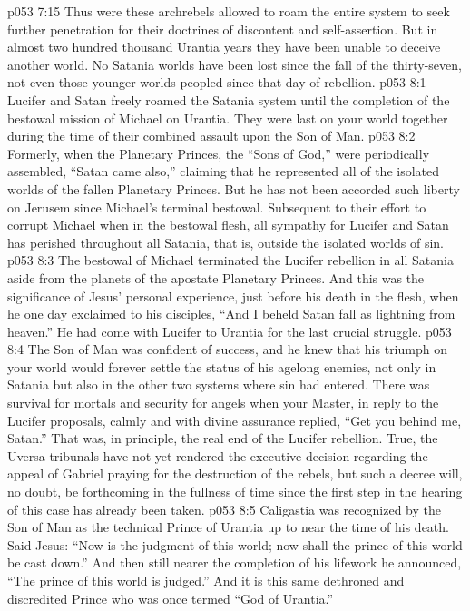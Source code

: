 \vs p053 7:15 Thus were these archrebels allowed to roam the entire system to seek further penetration for their doctrines of discontent and self\hyp{}assertion. But in almost two hundred thousand Urantia years they have been unable to deceive another world. No Satania worlds have been lost since the fall of the thirty\hyp{}seven, not even those younger worlds peopled since that day of rebellion.
\vs p053 8:1 Lucifer and Satan freely roamed the Satania system until the completion of the bestowal mission of Michael on Urantia. They were last on your world together during the time of their combined assault upon the Son of Man.
\vs p053 8:2 Formerly, when the Planetary Princes, the “Sons of God,” were periodically assembled, “Satan came also,” claiming that he represented all of the isolated worlds of the fallen Planetary Princes. But he has not been accorded such liberty on Jerusem since Michael’s terminal bestowal. Subsequent to their effort to corrupt Michael when in the bestowal flesh, all sympathy for Lucifer and Satan has perished throughout all Satania, that is, outside the isolated worlds of sin.
\pc \vs p053 8:3 The bestowal of Michael terminated the Lucifer rebellion in all Satania aside from the planets of the apostate Planetary Princes. And this was the significance of Jesus’ personal experience, just before his death in the flesh, when he one day exclaimed to his disciples, \textcolor{ubdarkred}{“And I beheld Satan fall as lightning from heaven.”} He had come with Lucifer to Urantia for the last crucial struggle.
\vs p053 8:4 The Son of Man was confident of success, and he knew that his triumph on your world would forever settle the status of his agelong enemies, not only in Satania but also in the other two systems where sin had entered. There was survival for mortals and security for angels when your Master, in reply to the Lucifer proposals, calmly and with divine assurance replied, \textcolor{ubdarkred}{“Get you behind me, Satan.”} That was, in principle, the real end of the Lucifer rebellion. True, the Uversa tribunals have not yet rendered the executive decision regarding the appeal of Gabriel praying for the destruction of the rebels, but such a decree will, no doubt, be forthcoming in the fullness of time since the first step in the hearing of this case has already been taken.
\vs p053 8:5 Caligastia was recognized by the Son of Man as the technical Prince of Urantia up to near the time of his death. Said Jesus: \textcolor{ubdarkred}{“Now is the judgment of this world; now shall the prince of this world be cast down.”} And then still nearer the completion of his lifework he announced, \textcolor{ubdarkred}{“The prince of this world is judged.”} And it is this same dethroned and discredited Prince who was once termed “God of Urantia.”
